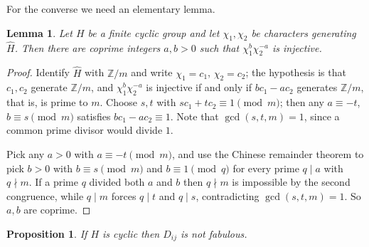 \documentclass[11pt]{amsart}
\theoremstyle{plain}
\newtheorem{lemma}[theorem]{Lemma}
\newtheorem{proposition}[theorem]{Proposition}
\theoremstyle{definition}
\theoremstyle{remark}
\numberwithin{equation}{section}
\begin{document}
For the converse we need an elementary lemma.

\begin{lemma} \label{lem:number_theory}
Let $H$ be a finite cyclic group and let $\chi_1, \chi_2$ be characters
generating $\widehat{H}$.  Then there are coprime integers $a, b > 0$ such
that $\chi_1^{b}\chi_2^{-a}$ is injective.
\end{lemma}

\begin{proof}
Identify $\widehat{H}$ with $\mathbb{Z}/m$ and write $\chi_1 = c_1$,
$\chi_2 = c_2$; the hypothesis is that $c_1, c_2$ generate $\mathbb{Z}/m$,
and $\chi_1^b \chi_2^{-a}$ is injective if and only if $bc_1 - ac_2$
generates $\mathbb{Z}/m$, that is, is prime to $m$.  Choose $s,t$ with
$sc_1 + tc_2 \equiv 1 \pmod m$; then any $a \equiv -t$, $b \equiv s
\pmod m$ satisfies $bc_1 - ac_2 \equiv 1$.  Note that $\gcd(s,t,m) = 1$,
since a common prime divisor would divide $1$.

Pick any $a > 0$ with $a \equiv -t \pmod m$, and use the Chinese remainder
theorem to pick $b > 0$ with $b \equiv s \pmod m$ and $b \equiv 1 \pmod q$
for every prime $q \mid a$ with $q \nmid m$.  If a prime $q$ divided both
$a$ and $b$ then $q \nmid m$ is impossible by the second congruence, while
$q \mid m$ forces $q \mid t$ and $q \mid s$, contradicting
$\gcd(s,t,m) = 1$.  So $a, b$ are coprime.
\end{proof}

\begin{proposition} \label{prop:cyclic_not_fabulous}
If $H$ is cyclic then $D_{ij}$ is not fabulous.
\end{proposition}
\end{document}

